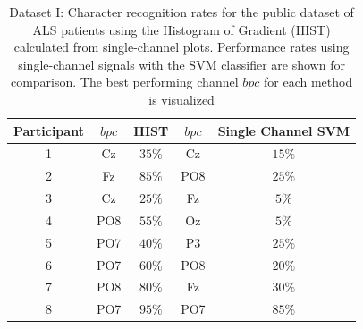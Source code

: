 \begin{table}[h!]
\caption[Dataset I - Single Channel Character Recognition Rates]{Dataset I: Character recognition rates for the public dataset of ALS patients using the Histogram of Gradient (HIST) calculated from  single-channel plots.  Performance rates using single-channel signals with the SVM classifier are shown for comparison.  The best performing channel $bpc$ for each method is visualized}
\centering
\begin{tabular}{c|cc|cc}
\toprule
\textbf{Participant}	&  $bpc$ 	&  HIST &  $bpc$	&  Single Channel SVM \\
\midrule
1     &     Cz   &   $35\%$    &  Cz   & $15\%$   \\
2     &     Fz   &   $85\%$      &  PO8   & $25\%$   \\
3     &     Cz   &   $25\%$    &  Fz   & $5\%$   \\
4     &     PO8 &   $55\%$   &  Oz   & $5\%$    \\
5     &     PO7 &   $40\%$    &  P3   & $25\%$   \\
6     &     PO7 &   $60\%$  &  PO8   & $20\%$    \\
7     &     PO8 &   $80\%$   &  Fz   & $30\%$     \\
8     &     PO7 &   $95\%$     &  PO7   & $85\%$ \\

\end{tabular}
\label{tab:resultsals}
\end{table}


